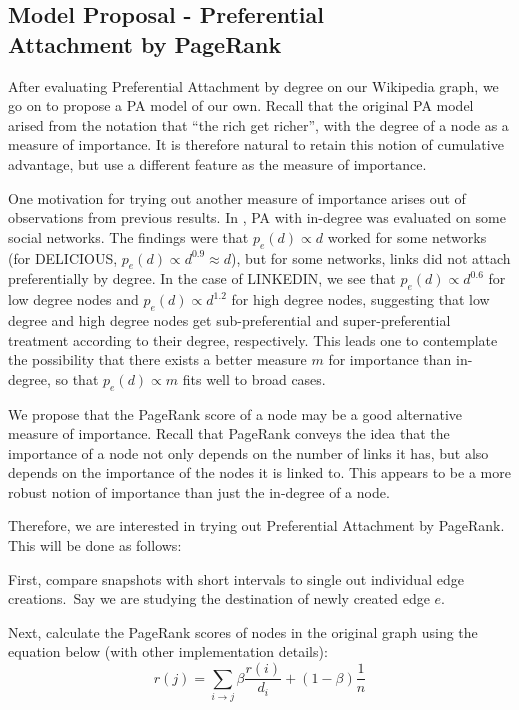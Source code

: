 \documentclass[10pt]{article}
\begin{document}
\begin{multicols}{2}
\section{Model Proposal - Preferential \\Attachment by PageRank}
\vspace{10pt}

After evaluating Preferential Attachment by degree on our Wikipedia graph, we go on to propose a PA model of our own. Recall that the original PA model arised from the notation that ``the rich get richer'', with the degree of a node as a measure of importance. It is therefore natural to retain this notion of cumulative advantage, but use a different feature as the measure of importance.

One motivation for trying out another measure of importance arises out of observations from previous results. In \cite{leskovec2008microscopic}, PA with in-degree was evaluated on some social networks. The findings were that $p_e(d)\propto d$ worked for some networks (for DELICIOUS, $p_e(d)\propto d^{0.9}\approx d$), but for some networks, links did not attach preferentially by degree. In the case of LINKEDIN, we see that $p_e(d)\propto d^{0.6}$ for low degree nodes and $p_e(d)\propto d^{1.2}$ for high degree nodes, suggesting that low degree and high degree nodes get sub-preferential and super-preferential treatment according to their degree, respectively. This leads one to contemplate the possibility that there exists a better measure $m$ for importance than in-degree, so that $p_e(d)\propto m$ fits well to broad cases. 


We propose that the PageRank score of a node may be a good alternative measure of importance. Recall that PageRank conveys the idea that the importance of a node not only depends on the number of links it has, but also depends on the importance of the nodes it is linked to. This appears to be a more robust notion of importance than just the in-degree of a node.

Therefore, we are interested in trying out Preferential Attachment by PageRank. This will be done as follows:

First, compare snapshots with short intervals to single out individual edge creations.~Say we are studying the destination of newly created edge $e$.

Next, calculate the PageRank scores of nodes in the original graph using the equation below (with other implementation details):
\begin{equation}
\label{3}
r(j)=\sum\limits_{i\rightarrow j}\beta\frac{r(i)}{d_i}+(1-\beta)\frac{1}{n}
\end{equation}


\end{multicols}
\end{document}
